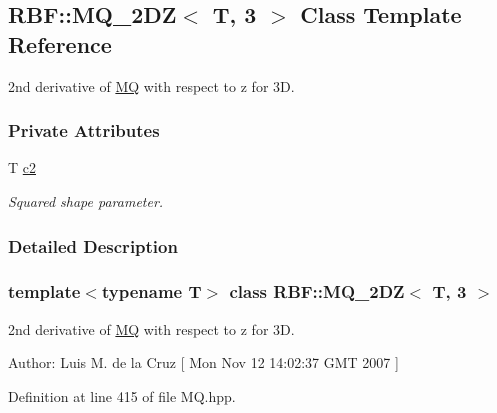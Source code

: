 \hypertarget{classRBF_1_1MQ__2DZ_3_01T_00_013_01_4}{
\subsection{RBF::MQ\_\-2DZ$<$ T, 3 $>$ Class Template Reference}
\label{classRBF_1_1MQ__2DZ_3_01T_00_013_01_4}
}
2nd derivative of \hyperlink{classRBF_1_1MQ}{MQ} with respect to z for 3D.  


\subsubsection*{Private Attributes}
\begin{CompactItemize}
\item 
\hypertarget{classRBF_1_1MQ__2DZ_3_01T_00_013_01_4_6043487a6ea85b7c5b28136b7deb66b4}{
T \hyperlink{classRBF_1_1MQ__2DZ_3_01T_00_013_01_4_6043487a6ea85b7c5b28136b7deb66b4}{c2}}
\label{classRBF_1_1MQ__2DZ_3_01T_00_013_01_4_6043487a6ea85b7c5b28136b7deb66b4}

\begin{CompactList}\small\item\em Squared shape parameter. \item\end{CompactList}\end{CompactItemize}


\subsubsection{Detailed Description}
\subsubsection*{template$<$typename T$>$ class RBF::MQ\_\-2DZ$<$ T, 3 $>$}

2nd derivative of \hyperlink{classRBF_1_1MQ}{MQ} with respect to z for 3D. 

\begin{Desc}
\item[Author:]Luis M. de la Cruz \mbox{[} Mon Nov 12 14:02:37 GMT 2007 \mbox{]} \end{Desc}


Definition at line 415 of file MQ.hpp.